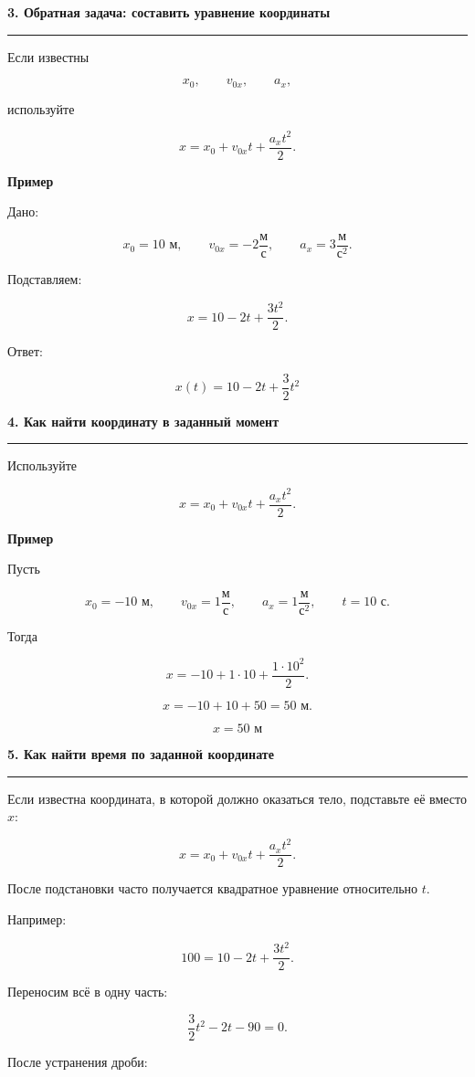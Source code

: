 \documentclass[a4paper,12pt]{article}
\newcommand{\sectiontitle}[1]{%
  \vspace{2mm}
  {\Large\bfseries\color{darkaccent}#1}\par
  \vspace{1mm}
  {\color{accent}\rule{\linewidth}{0.5pt}}
  \vspace{3mm}
}
\newcommand{\subsectiontitle}[1]{%
  \vspace{2mm}
  {\large\bfseries\color{darkaccent}#1}\par
  \vspace{1mm}
}
\begin{document}
\clearpage

\sectiontitle{3. Обратная задача: составить уравнение координаты}

Если известны

\[
x_0,\qquad v_{0x},\qquad a_x,
\]

используйте

\[
x=x_0+v_{0x}t+\frac{a_xt^2}{2}.
\]

\subsectiontitle{Пример}

Дано:

\[
x_0=10\text{ м},
\qquad
v_{0x}=-2\frac{\text{м}}{\text{с}},
\qquad
a_x=3\frac{\text{м}}{\text{с}^2}.
\]

Подставляем:

\[
x=10-2t+\frac{3t^2}{2}.
\]

Ответ:

\[
\boxed{
x(t)=10-2t+\frac{3}{2}t^2
}
\]

\sectiontitle{4. Как найти координату в заданный момент}

Используйте

\[
x=x_0+v_{0x}t+\frac{a_xt^2}{2}.
\]

\subsectiontitle{Пример}

Пусть

\[
x_0=-10\text{ м},\qquad
v_{0x}=1\frac{\text{м}}{\text{с}},\qquad
a_x=1\frac{\text{м}}{\text{с}^2},
\qquad
t=10\text{ с}.
\]

Тогда

\[
x=-10+1\cdot10+\frac{1\cdot10^2}{2}.
\]

\[
x=-10+10+50=50\text{ м}.
\]

\[
\boxed{x=50\text{ м}}
\]

\sectiontitle{5. Как найти время по заданной координате}

Если известна координата, в которой должно оказаться тело, подставьте её вместо \(x\):

\[
x=x_0+v_{0x}t+\frac{a_xt^2}{2}.
\]

После подстановки часто получается квадратное уравнение относительно \(t\).

Например:

\[
100=10-2t+\frac{3t^2}{2}.
\]

Переносим всё в одну часть:

\[
\frac{3}{2}t^2-2t-90=0.
\]

После устранения дроби:
\end{document}
